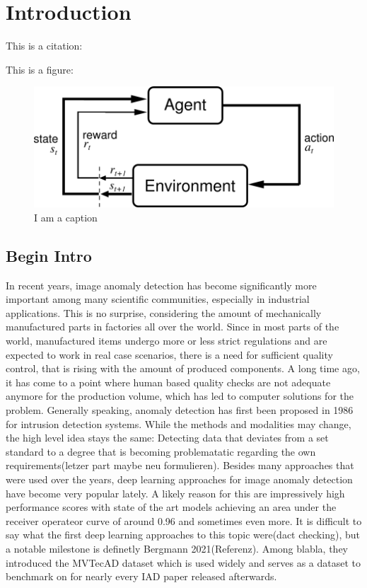 \chapter{Introduction}
\label{chap:introduction}
This is a citation: \cite{Vaswani2017}


This is a figure: 

\begin{figure}[ht]
    \centering
    \includegraphics[width=.5\textwidth]{figures/AgentEnviornment.png}
    \caption{I am a caption}
    \label{fig:my_label}
\end{figure}



\section{Begin Intro}
In recent years, image anomaly detection has become significantly more important among many scientific communities, especially in industrial applications. This is no surprise, considering the
amount of mechanically manufactured parts in factories all over the world. Since in most parts of the world, manufactured items undergo more or less strict regulations and are expected to work
in real case scenarios, there is a need for sufficient quality control, that is rising with the amount of produced components. A long time ago, it has come to a point where human based quality 
checks are not adequate anymore for the production volume, which has led to computer solutions for the problem. Generally speaking, anomaly detection has first been proposed in 1986 for 
intrusion detection systems. While the methods and modalities may change, the high level idea stays the same: Detecting data that deviates from a set standard to a degree that is becoming
problematatic regarding the own requirements(letzer part maybe neu formulieren). Besides many approaches that were used over the years, deep learning approaches for image anomaly detection have
become very popular lately. A likely reason for this are impressively high performance scores with state of the art models achieving an area under the receiver operateor curve of around 0.96 and 
sometimes even more.
It is difficult to say what the first deep learning approaches to this topic were(dact checking), but a notable milestone is definetly Bergmann 2021(Referenz). Among blabla, they introduced
the MVTecAD dataset which is used widely and serves as a dataset to benchmark on for nearly every IAD paper released afterwards.







